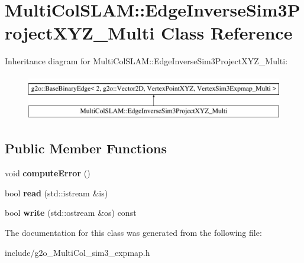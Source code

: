 \hypertarget{classMultiColSLAM_1_1EdgeInverseSim3ProjectXYZ__Multi}{}\section{Multi\+Col\+S\+L\+AM\+:\+:Edge\+Inverse\+Sim3\+Project\+X\+Y\+Z\+\_\+\+Multi Class Reference}
\label{classMultiColSLAM_1_1EdgeInverseSim3ProjectXYZ__Multi}
Inheritance diagram for Multi\+Col\+S\+L\+AM\+:\+:Edge\+Inverse\+Sim3\+Project\+X\+Y\+Z\+\_\+\+Multi\+:\begin{figure}[H]
\begin{center}
\leavevmode
\includegraphics[height=2.000000cm]{classMultiColSLAM_1_1EdgeInverseSim3ProjectXYZ__Multi}
\end{center}
\end{figure}
\subsection*{Public Member Functions}
\begin{DoxyCompactItemize}
\item 
void {\bfseries compute\+Error} ()\hypertarget{classMultiColSLAM_1_1EdgeInverseSim3ProjectXYZ__Multi_ad2c7dfc67867f217aca806fd9a2a6cd7}{}\label{classMultiColSLAM_1_1EdgeInverseSim3ProjectXYZ__Multi_ad2c7dfc67867f217aca806fd9a2a6cd7}

\item 
bool {\bfseries read} (std\+::istream \&is)\hypertarget{classMultiColSLAM_1_1EdgeInverseSim3ProjectXYZ__Multi_ad1f8040a1e204d6c8ab18fd91aae928d}{}\label{classMultiColSLAM_1_1EdgeInverseSim3ProjectXYZ__Multi_ad1f8040a1e204d6c8ab18fd91aae928d}

\item 
bool {\bfseries write} (std\+::ostream \&os) const \hypertarget{classMultiColSLAM_1_1EdgeInverseSim3ProjectXYZ__Multi_a9f7d94af5867926b3d16ef5152d5d246}{}\label{classMultiColSLAM_1_1EdgeInverseSim3ProjectXYZ__Multi_a9f7d94af5867926b3d16ef5152d5d246}

\end{DoxyCompactItemize}


The documentation for this class was generated from the following file\+:\begin{DoxyCompactItemize}
\item 
include/g2o\+\_\+\+Multi\+Col\+\_\+sim3\+\_\+expmap.\+h\end{DoxyCompactItemize}
